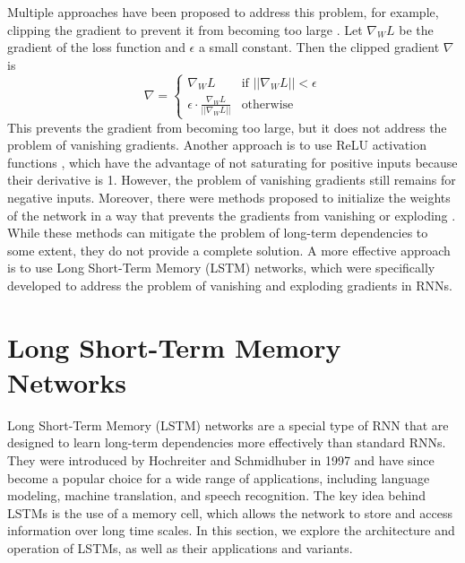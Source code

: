 \documentclass{article}
\begin{document}
Multiple approaches have been proposed to address this problem, for example, clipping the
gradient to prevent it from becoming too large
\cite{pascanuDifficultyTrainingRecurrent2013}. Let $\nabla_W L$ be the gradient of the
loss function and $\epsilon$ a small constant. Then the clipped gradient $\nabla$ is
\begin{equation}
  \nabla =
  \begin{cases}
    \nabla_W L                                       & \text{if } ||\nabla_W L|| < \epsilon \\
    \epsilon \cdot \frac{\nabla_W L}{||\nabla_W L||} & \text{otherwise}
  \end{cases}
\end{equation}
This prevents the gradient from becoming too large, but it does not address the problem of
vanishing gradients. Another approach is to use ReLU activation functions
\cite{glorotDeepSparseRectifier2010}, which have the advantage of not saturating for
positive inputs because their derivative is 1. However, the problem of vanishing gradients
still remains for negative inputs. Moreover, there were methods proposed to initialize the
weights of the network in a way that prevents the gradients from vanishing or exploding
\cite{kumar2017weight}. While these methods can mitigate the problem of long-term
dependencies to some extent, they do not provide a complete solution. A more effective
approach is to use Long Short-Term Memory (LSTM) networks, which were specifically
developed to address the problem of vanishing and exploding gradients in RNNs.



\section{Long Short-Term Memory Networks}
\label{ch:3}

Long Short-Term Memory (LSTM) networks are a special type of RNN that are designed to
learn long-term dependencies more effectively than standard RNNs. They were introduced by
Hochreiter and Schmidhuber in 1997 \cite{hochreiterLongShorttermMemory1997} and have since
become a popular choice for a wide range of applications, including language modeling,
machine translation, and speech recognition. The key idea behind LSTMs is the use of a
memory cell, which allows the network to store and access information over long time
scales. In this section, we explore the architecture and operation of LSTMs, as well as
their applications and variants.
\end{document}
